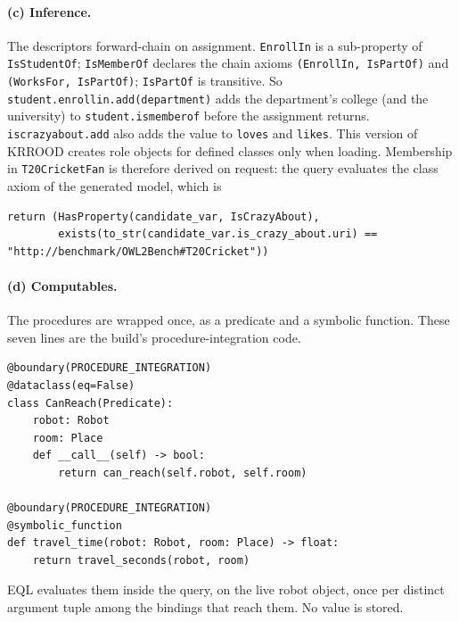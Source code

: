 \documentclass[10pt]{article}
\newcommand{\brkunderscore}{\textunderscore\allowbreak}
\newcommand{\code}[1]{{\let\_\brkunderscore\texttt{#1}}}
\begin{document}
\paragraph{(c) Inference.} The descriptors forward-chain on assignment. \code{EnrollIn} is a sub-property of
\code{IsStudentOf}; \code{IsMemberOf} declares the chain axioms \code{(EnrollIn, IsPartOf)} and
\code{(WorksFor, IsPartOf)}; \code{IsPartOf} is transitive. So \code{student.enroll\_in.add(department)} adds the
department's college (and the university) to \code{student.is\_member\_of} before the assignment returns.
\code{is\_crazy\_about.add} also adds the value to \code{loves} and \code{likes}. This version of KRROOD creates role
objects for defined classes only when loading. Membership in \code{T20CricketFan} is therefore derived on request: the
query evaluates the class axiom of the generated model, which is
\begin{lstlisting}[style=py]
return (HasProperty(candidate_var, IsCrazyAbout),
        exists(to_str(candidate_var.is_crazy_about.uri) == "http://benchmark/OWL2Bench#T20Cricket"))
\end{lstlisting}

\paragraph{(d) Computables.} The procedures are wrapped once, as a predicate and a symbolic function. These seven lines
are the build's procedure-integration code.
\begin{lstlisting}[style=py]
@boundary(PROCEDURE_INTEGRATION)
@dataclass(eq=False)
class CanReach(Predicate):
    robot: Robot
    room: Place
    def __call__(self) -> bool:
        return can_reach(self.robot, self.room)

@boundary(PROCEDURE_INTEGRATION)
@symbolic_function
def travel_time(robot: Robot, room: Place) -> float:
    return travel_seconds(robot, room)
\end{lstlisting}
EQL evaluates them inside the query, on the live robot object, once per distinct argument tuple among the bindings that reach them. No value is stored.
\end{document}
